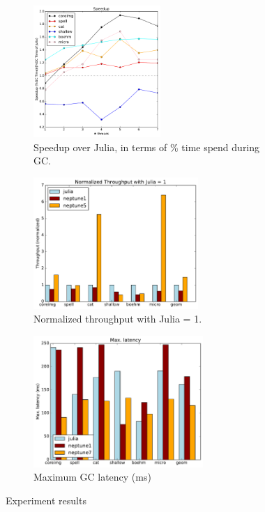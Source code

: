 \begin{figure}[h]
  \centering
    \begin{subfigure}{0.25\textwidth}
      \centering
      \includegraphics[height=5cm]{figures/speedup-julia.pdf}
      \caption{Speedup over Julia, in terms of \% time spend during GC.}
      \label{fig:speedup}
    \end{subfigure}
    \begin{subfigure}{0.32\textwidth}
      \centering
      \includegraphics[height=5cm]{figures/throughput-normalized-julia.pdf}
      
      \caption{Normalized throughput with Julia = 1.}
      \label{fig:throughput}
    \end{subfigure}
    \begin{subfigure}{0.32\textwidth}
      \centering
      \includegraphics[height=5cm]{figures/max-latency.pdf}
      \caption{Maximum GC latency (ms)}
      \label{fig:latency}
    \end{subfigure}
    \caption{Experiment results}
  \label{fig:results}
\end{figure}

